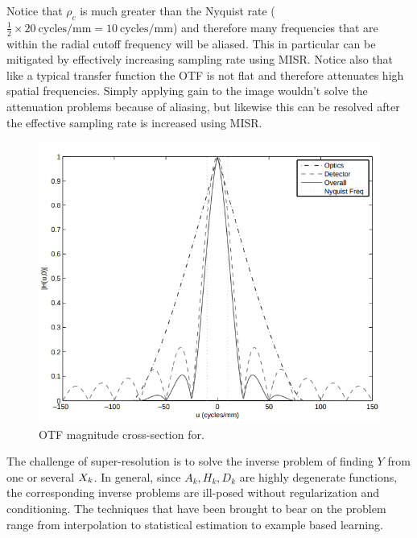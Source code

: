 %
Notice that \(\rho_c\) is much greater than the Nyquist rate (\(\frac{1}{2} \times 20~\text{cycles}/\text{mm} = 10~\text{cycles}/\text{mm}\)) and therefore many frequencies that are within the radial cutoff frequency will be aliased.
%
This in particular can be mitigated by effectively increasing sampling rate using MISR.
%
Notice also that like a typical transfer function the OTF is not flat and therefore attenuates high spatial frequencies.
%
Simply applying gain to the image wouldn't solve the attenuation problems because of aliasing, but likewise this can be resolved after the effective sampling rate is increased using MISR.
\begin{figure}
	\includegraphics[width=\linewidth,keepaspectratio]{figures/background/mtf.png}
	\caption{OTF magnitude cross-section for\cite{milanfar2017super}.}
	\label{fig:mtf}
\end{figure}

The challenge of super-resolution is to solve the inverse problem of finding \(Y\) from one or several \(X_k\).
%
In general, since \(A_k, H_k, D_k\) are highly degenerate functions, the corresponding inverse problems are ill-posed without regularization and conditioning.
%
The techniques that have been brought to bear on the problem range from interpolation to statistical estimation to example based learning.
